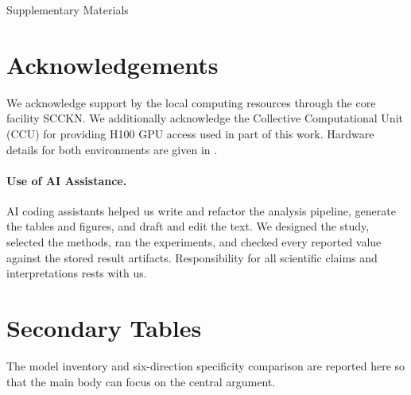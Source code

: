 \documentclass[twocolumn]{article}
\begin{document}

{
\small

\clearpage
\printbibliography
}

\clearpage
\begin{appendices}
\onecolumn
\setcounter{figure}{0}
\setcounter{table}{0}
\renewcommand{\thesection}{\Alph{section}}%
\renewcommand{\thesubsection}{\thesection.\arabic{subsection}}
\renewcommand\thefigure{S.\arabic{figure}}
\renewcommand\thetable{S.\arabic{table}}
\begin{center}
    \begin{minipage}{\textwidth}
        \centering
        \fontsize{16}{20}\selectfont
        Supplementary Materials
    \end{minipage}
\end{center}
\vspace{.5cm}

\section*{Acknowledgements}
We acknowledge support by the local computing resources through the core
facility SCCKN.
We additionally acknowledge the Collective Computational Unit (CCU) for
providing H100 GPU access used in part of this work.
Hardware details for both environments are given in
.

\paragraph{Use of AI Assistance.}
AI coding assistants helped us write and refactor the analysis pipeline,
generate the tables and figures, and draft and edit the text. We designed the
study, selected the methods, ran the experiments, and checked every reported
value against the stored result artifacts. Responsibility for all scientific
claims and interpretations rests with us.

\section*{Secondary Tables}
The model inventory and six-direction specificity comparison are reported
here so that the main body can focus on the central argument.


\end{appendices}
\end{document}
